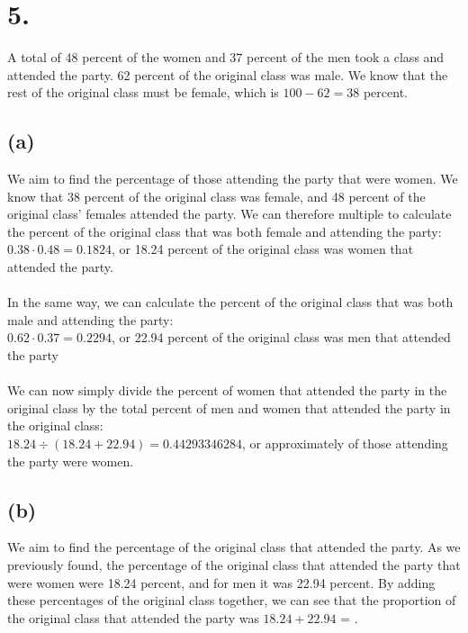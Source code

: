 \documentclass{article}
\begin{document}
\section*{5.}
{\Large 
A total of 48 percent of the women and 37 percent of the men took a class and attended the party. 62 percent of the original class was male. We know that the rest of the original class must be female, which is $100 - 62 = 38$ percent.

\subsection*{(a)}
We aim to find the percentage of those attending the party that were women. We know that 38 percent of the original class was female, and 48 percent of the original class' females attended the party. We can therefore multiple to calculate the percent of the original class that was both female and attending the party: \\
$0.38 \cdot 0.48 = 0.1824$, or 18.24 percent of the original class was women that attended the party. \\ \\
In the same way, we can calculate the percent of the original class that was both male and attending the party: \\
$0.62 \cdot 0.37 = 0.2294$, or 22.94 percent of the original class was men that attended the party \\ \\
We can now simply divide the percent of women that attended the party in the original class by the total percent of men and women that attended the party in the original class: \\
$18.24 \div (18.24 + 22.94) = 0.44293346284$, or approximately  of those attending the party were women.

\subsection*{(b)}
We aim to find the percentage of the original class that attended the party. As we previously found, the percentage of the original class that attended the party that were women were 18.24 percent, and for men it was 22.94 percent. By adding these percentages of the original class together, we can see that the proportion of the original class that attended the party was $18.24 + 22.94$ = .

}
\end{document}
